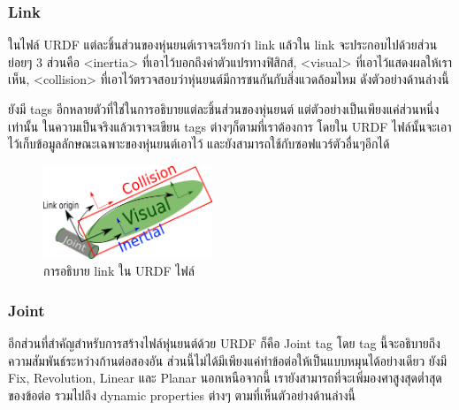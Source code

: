 \subsubsection*{Link}
ในไฟล์ URDF แต่ละชิ้นส่วนของหุ่นยนต์เราจะเรียกว่า link แล้วใน link จะประกอบไปด้วยส่วนย่อยๆ
3 ส่วนคือ <inertia> ที่เอาไว้บอกถึงค่าตัวแปรทางฟิสิกส์, <visual> ที่เอาไว้แสดงผลให้เราเห็น, 
<collision> ที่เอาไว้ตรวจสอบว่าหุ่นยนต์มีการชนกันกับสิ่งแวดล้อมไหม ดังตัวอย่างด้านล่างนี้


ยังมี tags อีกหลายตัวที่ใช่ในการอธิบายแต่ละชิ้นส่วนของหุ่นยนต์ แต่ตัวอย่างเป็นเพียงแค่ส่วนหนึ่งเท่านั้น
ในความเป็นจริงแล้วเราจะเขียน tags ต่างๆก็ตามที่เราต้องการ โดยใน URDF ไฟล์นั้นจะเอาไว้เก็บข้อมูลลักษณะเฉพาะของหุ่นยนต์เอาไว้
และยังสามารถใช้กับซอฟแวร์ตัวอื่นๆอีกได้
\begin{figure}[h]
	\centering
	\includegraphics[width=0.45\textwidth]{chapter3/images/urdf_link.png}
	\caption{การอธิบาย link ใน URDF ไฟล์}
	\label{fig:urdf_link}
\end{figure}

\subsubsection*{Joint}
อีกส่วนที่สำคัญสำหรับการสร้างไฟล์หุ่นยนต์ด้วย URDF ก็คือ Joint tag โดย tag นี้จะอธิบายถึงความสัมพันธ์ระหว่างก้านต่อสองอัน
ส่วนนี้ไม่ได้มีเพียงแค่ทำข้อต่อให้เป็นแบบหมุนได้อย่างเดียว ยังมี Fix, Revolution, Linear และ Planar นอกเหนือจากนี้
เรายังสามารถที่จะเพิ่มองศาสูงสุดต่ำสุดของข้อต่อ รวมไปถึง dynamic properties ต่างๆ ตามที่เห็นตัวอย่างด้านล่างนี้


